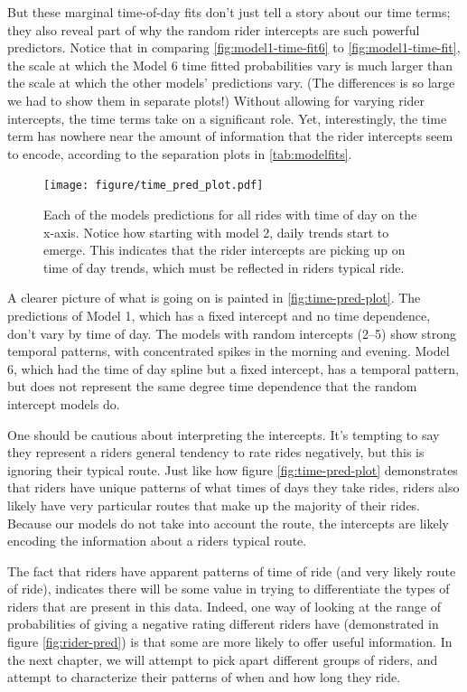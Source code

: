 \documentclass[]{article}
\begin{document}
But these marginal time-of-day fits don't just tell a story about our
time terms; they also reveal part of why the random rider intercepts are
such powerful predictors. Notice that in comparing
\autoref{fig:model1-time-fit6} to \autoref{fig:model1-time-fit}, the
scale at which the Model 6 time fitted probabilities vary is much larger
than the scale at which the other models' predictions vary. (The
differences is so large we had to show them in separate plots!) Without
allowing for varying rider intercepts, the time terms take on a
significant role. Yet, interestingly, the time term has nowhere near the
amount of information that the rider intercepts seem to encode,
according to the separation plots in \autoref{tab:modelfits}.

\begin{figure}[tbh]
\centering
\texttt{[image: figure/time\_pred\_plot.pdf]}
\caption[Each of the models predictions for all rides with time of day on the x-axis.
Notice how starting with model 2, daily trends start to emerge. This indicates that the
rider intercepts are picking up on time of day trends, which must be reflected in riders
typical ride.]{\normalsize{Each of the models predictions for all rides with time of day on the x-axis.
Notice how starting with model 2, daily trends start to emerge. This indicates that the
rider intercepts are picking up on time of day trends, which must be reflected in riders
typical ride.}}
\label{fig:time-pred-plot}
\end{figure}

A clearer picture of what is going on is painted in
\autoref{fig:time-pred-plot}. The predictions of Model 1, which has a
fixed intercept and no time dependence, don't vary by time of day. The
models with random intercepts (2--5) show strong temporal patterns, with
concentrated spikes in the morning and evening. Model 6, which had the
time of day spline but a fixed intercept, has a temporal pattern, but
does not represent the same degree time dependence that the random
intercept models do.

One should be cautious about interpreting the intercepts. It's tempting
to say they represent a riders general tendency to rate rides
negatively, but this is ignoring their typical route. Just like how
figure \autoref{fig:time-pred-plot} demonstrates that riders have unique
patterns of what times of days they take rides, riders also likely have
very particular routes that make up the majority of their rides. Because
our models do not take into account the route, the intercepts are likely
encoding the information about a riders typical route.

The fact that riders have apparent patterns of time of ride (and very
likely route of ride), indicates there will be some value in trying to
differentiate the types of riders that are present in this data. Indeed,
one way of looking at the range of probabilities of giving a negative
rating different riders have (demonstrated in figure
\autoref{fig:rider-pred}) is that some are more likely to offer useful
information. In the next chapter, we will attempt to pick apart
different groups of riders, and attempt to characterize their patterns
of when and how long they ride.
\end{document}
